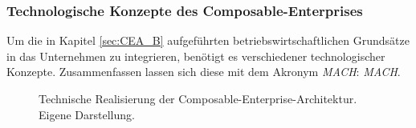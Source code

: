 \subsubsection{Technologische Konzepte des Composable-Enterprises}
Um die in Kapitel \ref{sec:CEA_B} aufgeführten betriebswirtschaftlichen Grundsätze in das Unternehmen zu integrieren, benötigt es verschiedener technologischer Konzepte. Zusammenfassen lassen sich diese mit dem Akronym \textit{MACH}: \textit{\acl{MACH}}.
\begin{center}
	\begin{figure}[H]
		\centering
		\caption[Technische Realisierung der Composable-Enterprise-Architektur]{Technische Realisierung der Composable-Enterprise-Architektur. Eigene Darstellung.}
		\label{fig:CEA_K}
	\end{figure}	
\end{center}
\vspace*{-15mm}
